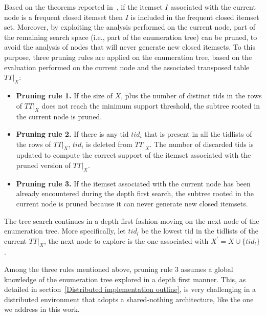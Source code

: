 Based on the theorems reported in~\cite{Zaki_Carpenter}, if the itemset $I$
associated with the current node is a frequent closed itemset then $I$
is included in the frequent closed itemset set. Moreover, by exploiting the
analysis performed on the current node, part of the remaining search space
(i.e.,
part of the enumeration tree) can be pruned, to avoid the analysis of nodes that
will never generate new closed itemsets.
To this purpose, three pruning rules are applied on the enumeration tree, based
on the evaluation performed on the current node and the associated
transposed table $TT|_{X}$:
\begin{itemize}
\item \textbf{Pruning rule 1.} If the size of $X$, plus the number of distinct
tids in the rows of $TT|_{X}$ does not reach the minimum support threshold,
the subtree rooted in the current node is pruned.
\item \textbf{Pruning rule 2.} If there is any tid $tid_i$ that is present in
all the tidlists of the rows of $TT|_{X}$, $tid_i$ is deleted from $TT|_{X}$.
The number of discarded tids is updated to compute the correct support of the
itemset associated with the pruned version of $TT|_{X}$.
\item \textbf{Pruning rule 3.} If the itemset associated with the current node
has been already encountered during the depth first search,
the subtree rooted in the current node is pruned because it can never generate
new closed itemsets.
\end{itemize}


The tree search continues in a depth first fashion moving on the next node of
the enumeration tree. More specifically,
let $tid_l$ be the lowest tid in the tidlists of the current $TT|_{X}$, the next
node to explore is the one associated with
$X^\prime=X\cup \{tid_l\}$.


Among the three rules mentioned above, pruning rule 3 assumes a global knowledge
of the enumeration tree explored in a depth first manner.
This, as detailed in section~\ref{Distributed implementation outline}, is very
challenging in a distributed environment that adopts a shared-nothing
architecture, like the one we address in this work.



